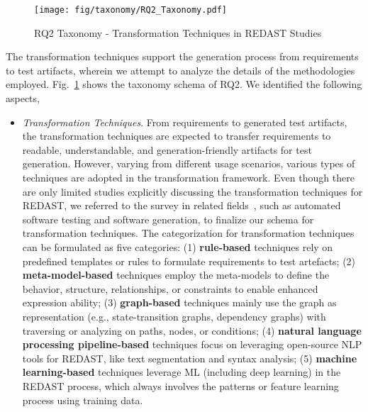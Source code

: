 \begin{figure}[!t]
    \centering
    \texttt{[image: fig/taxonomy/RQ2\_Taxonomy.pdf]}
    \caption{RQ2 Taxonomy - Transformation Techniques in REDAST Studies}
    \label{fig:RQ2_taxonomy}
\end{figure}

The transformation techniques support the generation process from requirements to test artifacts, wherein we attempt to analyze the details of the methodologies employed. Fig.~\ref{fig:RQ2_taxonomy} shows the taxonomy schema of RQ2. We identified the following aspects,
\begin{itemize}
    \item \emph{Transformation Techniques}. From requirements to generated test artifacts, the transformation techniques are expected to transfer requirements to readable, understandable, and generation-friendly artifacts for test generation. However, varying from different usage scenarios, various types of techniques are adopted in the transformation framework. Even though there are only limited studies explicitly discussing the transformation techniques for REDAST, we referred to the survey in related fields~\cite{transformation_tech_01, transformation_tech_02, transformation_tech_03, transformation_tech_04}, such as automated software testing and software generation, to finalize our schema for transformation techniques. The categorization for transformation techniques can be formulated as five categories: 
    (1) \textbf{rule-based} techniques rely on predefined templates or rules to formulate requirements to test artefacts;
    (2) \textbf{meta-model-based} techniques employ the meta-models to define the behavior, structure, relationships, or constraints to enable enhanced expression ability; 
    (3) \textbf{graph-based} techniques mainly use the graph as representation (e.g., state-transition graphs, dependency graphs) with traversing or analyzing on paths, nodes, or conditions;
    (4) \textbf{natural language processing pipeline-based} techniques focus on leveraging open-source NLP tools for REDAST, like text segmentation and syntax analysis; 
    (5) \textbf{machine learning-based} techniques leverage ML (including deep learning) in the REDAST process, which always involves the patterns or feature learning process using training data. 
    

\end{itemize}
